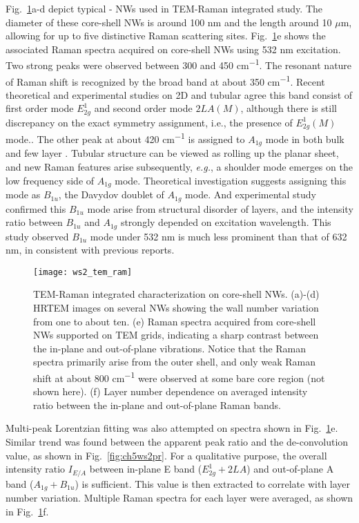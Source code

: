 Fig.~\ref{fig:ch5ws2ram}a-d depict typical - NWs used in TEM-Raman integrated study. The diameter of these core-shell NWs is around 100 nm and the length around 10 $\mu$m, allowing for up to five distinctive Raman scattering sites. Fig.~\ref{fig:ch5ws2ram}e shows the associated Raman spectra acquired on core-shell NWs using 532 nm excitation. Two strong peaks were observed between 300 and 450 \si{cm^{-1}}. The resonant nature\cite{Stacy1985} of Raman shift is recognized by the broad band at about 350 \si{cm^{-1}}.  Recent theoretical\cite{Molina-Sanchez2011} and experimental\cite{Staiger2012} studies on 2D and tubular  agree this band consist of first order mode $E_{2g}^1$ and second order mode $2LA(M)$, although there is still discrepancy on the exact symmetry assignment, i.e., the presence of $E_{2g}^1(M)$ mode.\cite{Berkdemir2013,Peimyoo2013}. The other peak at about 420 \si{cm^{-1}} is assigned to $A_{1g}$ mode in both bulk\cite{Sekine1980} and few layer . Tubular  structure can be viewed as rolling up the planar  sheet, and new Raman features arise subsequently, \emph{e.g.}, a shoulder mode emerges on the low frequency side of $A_{1g}$ mode. Theoretical investigation suggests assigning this mode as $B_{1u}$, the Davydov doublet of $A_{1g}$ mode.\cite{Ataca2012} And experimental study confirmed this $B_{1u}$ mode arise from structural disorder of  layers, and the intensity ratio between $B_{1u}$ and $A_{1g}$ strongly depended on excitation wavelength.\cite{Staiger2012} This study observed $B_{1u}$ mode under 532 nm is much less prominent than that of 632 nm, in consistent with previous reports.\cite{Krause2009,Krause2009a} 
\begin{figure}[htb]
\centering
\texttt{[image: ws2\_tem\_ram]}
\caption[TEM-Raman integrated characterization on core-shell NWs]{TEM-Raman integrated characterization on core-shell NWs. (a)-(d) HRTEM images on several NWs showing the  wall number variation from one to about ten. (e) Raman spectra acquired from core-shell NWs supported on TEM grids, indicating a sharp contrast between the in-plane and out-of-plane vibrations. Notice that the Raman spectra primarily arise from the outer  shell, and only weak Raman shift at about 800 \si{cm^{-1}} were observed at some bare core region (not shown here). (f) Layer number dependence on averaged intensity ratio between the in-plane and out-of-plane Raman bands. }
\label{fig:ch5ws2ram}
\end{figure}
Multi-peak Lorentzian fitting was also attempted on spectra shown in Fig.~\ref{fig:ch5ws2ram}e. Similar trend was found between the apparent peak ratio and the de-convolution value, as shown in Fig.~\ref{fig:ch5ws2pr}. For a qualitative purpose, the overall intensity ratio $I_{E/A}$ between in-plane E band ($E_{2g}^1+2LA$) and out-of-plane A band ($A_{1g}+B_{1u}$) is sufficient. This value is then extracted to correlate with layer number variation. Multiple Raman spectra for each layer were averaged, as shown in Fig.~\ref{fig:ch5ws2ram}f. 
